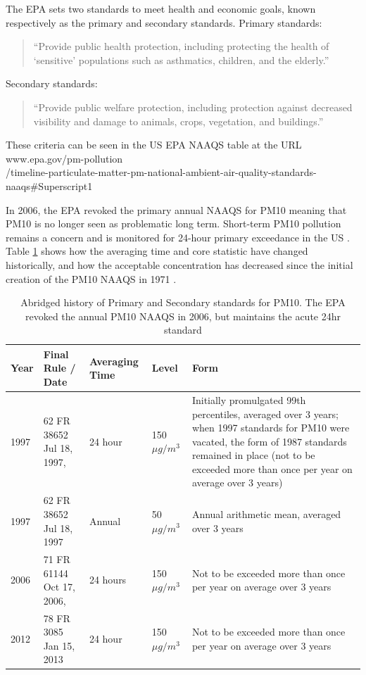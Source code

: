 \documentclass{article}
\begin{document}
	The \ac{EPA} sets two standards to meet health and economic goals, known respectively as the primary and secondary standards.  Primary standards:
	\begin{quote}
		``Provide public health protection, including protecting the health of `sensitive' populations such as asthmatics, children, and the elderly.'' 
	\end{quote}
	Secondary standards:
	\begin{quote}
		``Provide public welfare protection, including protection against decreased visibility and damage to animals, crops, vegetation, and buildings.''  
	\end{quote}
	These criteria can be 
	seen in the US EPA NAAQS table
	at the URL\\
	www.epa.gov/pm-pollution \\/timeline-particulate-matter-pm-national-ambient-air-quality-standards-naaqs\#Superscript1
	
	In 2006, the EPA revoked the primary annual \ac{NAAQS} for \ac{PM10} meaning that \ac{PM10} is no longer seen as problematic long term.  Short-term \ac{PM10} pollution remains a concern and is monitored for 24-hour primary exceedance in the US 
	.  Table \ref{tab:EPA_PM10_standards} shows how the averaging time and core statistic have changed historically, and how the acceptable concentration has decreased since the initial creation of the \ac{PM10} \ac{NAAQS} in 1971 
	.
	\begin{table}[ht]
		\centering
		\begin{tabular}{p{}|p{}|p{}|p{0.14%
					\textwidth}|p{}}
			Year & Final Rule / Date & Averaging Time & Level & Form \\
			\hline
			1997 & 62 FR 38652 Jul 18, 1997, & 24 hour & 150 $\mu g/m^3$ &	Initially promulgated 99th percentiles, averaged over 3 years; when 1997 standards for PM10 were vacated, the form of 1987 standards remained in place (not to be exceeded more than once per year on average over 3 years) \\
			1997 & 62 FR 38652 Jul 18, 1997 & Annual & 50 $\mu g/m^3$ & Annual arithmetic mean, averaged over 3 years \\
			2006 & 71 FR 61144 Oct 17, 2006, & 24 hours & 150 $\mu g/m^3$ & Not to be exceeded more than once per year on average over 3 years \\
			2012 & 78 FR 3085 Jan 15, 2013 & 24 hour & 150 $\mu g/m^3$ & Not to be exceeded more than once per year on average over 3 years \\
		\end{tabular}
		\caption{Abridged history of Primary and Secondary standards for PM10.  The \ac{EPA} revoked the annual PM10 \ac{NAAQS} in 2006, but maintains the acute 24hr standard 
		}
		\label{tab:EPA_PM10_standards}
	\end{table}
	
\end{document}
